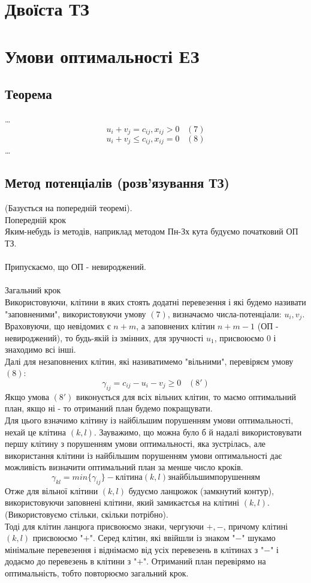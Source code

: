 \documentclass[12pt,a4paper]{book}
\begin{document}
\section{Двоїста ТЗ}
\section{Умови оптимальності ЕЗ}
\subsection{Теорема}
\dots
$$u_i+v_j=c_{ij},	x_{ij}>0\;\;\;(7)$$
$$u_i+v_j{\leq}c_{ij},	x_{ij}=0\;\;\;(8)$$
\dots
\subsection{Метод потенціалів (розв’язування ТЗ)}
(Базується на попередній теоремі).\\
Попередній крок\\
Яким-небудь із методів, наприклад методом Пн-Зх кута будуємо початковий ОП ТЗ.\\
\\
Припускаємо, що ОП - невироджений.\\
\\
Загальний крок\\
Використовуючи, клітини в яких стоять додатні перевезення і які будемо називати "заповненими", використовуючи умову $(7)$, визначаємо числа-потенціали: $u_i, v_j$. Враховуючи, що невідомих є $n+m$, а заповнених клітин $n+m-1$  (ОП - невироджений), то будь-якій із змінних, для зручності $u_1$, присвоюємо 0 і знаходимо всі інші.\\
Далі для незаповнених клітин, які називатимемо "вільними", перевіряєм умову $(8)$:
$$\gamma_{ij}=c_{ij}-u_i-v_j{\geq}0\;\;\;(8')$$
Якщо умова $(8')$ виконується для всіх вільних клітин, то маємо оптимальний план, якщо ні - то отриманий план будемо покращувати.\\
Для цього взначимо клітину із найбільшим порушенням умови оптимальності, нехай це клітина $(k,l)$. Зауважимо, що можна було б й надалі використовувати першу клітину з порушенням умови оптимальності, яка зустрілась, але використання клітини із найбільшим порушенням умови оптимальності дає можливість визначити оптимальний план за менше число кроків.
$$\gamma_{kl}=min\{\gamma_{ij}\} - клітина (k,l) з найбільшим порушенням$$
Отже для вільної клітини $(k,l)$ будуємо ланцюжок (замкнутий контур), використовуючи заповнені клітини, який замикаєтсья на клітині $(k,l)$. (Використовуємо стільки, скільки потрібно).\\
Тоді для клітин ланцюга присвоюємо знаки, чергуючи $+,-$, причому клітині $(k,l)$ присвоюємо "$+$". Серед клітин, які ввійшли із знаком "$-$" шукамо мінімальне перевезення і віднімаємо від усіх перевезень в клітинах з "$-$" і додаємо до перевезень в клітини з "$+$". Отриманий план перевірямо на оптимальність, тобто повторюємо загальний крок.
\end{document}
